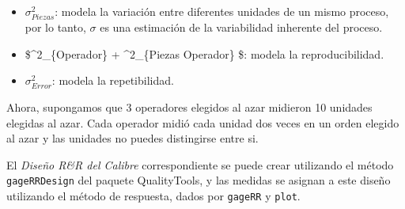\documentclass[
]{book}
\begin{document}
\begin{itemize}
\item
  \(\sigma^2_{Piezas}\): modela la variación entre diferentes unidades de un mismo proceso, por lo tanto, \(\sigma\) es una estimación de la variabilidad inherente del proceso.
\item
  \$\sigma\^{}2\_\{Operador\} + \sigma\^{}2\_\{Piezas \times Operador\} \$: modela la reproducibilidad.
\item
  \(\sigma^2_{Error}\): modela la repetibilidad.
\end{itemize}

Ahora, supongamos que 3 operadores elegidos al azar midieron 10 unidades elegidas al azar. Cada operador midió cada unidad dos veces en un orden elegido al azar y las unidades no puedes distingirse entre si.

El \emph{Diseño R\&R del Calibre} correspondiente se puede crear utilizando el método \texttt{gageRRDesign} del paquete QualityTools, y las medidas se asignan a este diseño utilizando el método de respuesta, dados por \texttt{gageRR} y \texttt{plot}.
\end{document}
